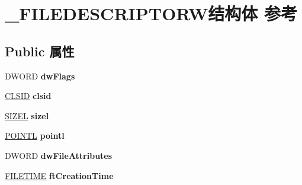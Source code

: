\hypertarget{struct___f_i_l_e_d_e_s_c_r_i_p_t_o_r_w}{}\section{\+\_\+\+F\+I\+L\+E\+D\+E\+S\+C\+R\+I\+P\+T\+O\+R\+W结构体 参考}
\label{struct___f_i_l_e_d_e_s_c_r_i_p_t_o_r_w}
\subsection*{Public 属性}
\begin{DoxyCompactItemize}
\item 
\mbox{\label{struct___f_i_l_e_d_e_s_c_r_i_p_t_o_r_w_a7b1cb805e66caefee9dcec921955cca6}} 
D\+W\+O\+RD {\bfseries dw\+Flags}
\item 
\mbox{\label{struct___f_i_l_e_d_e_s_c_r_i_p_t_o_r_w_acfcd6350deb7e481fba9cfd61d1a7567}} 
\hyperlink{struct___i_i_d}{C\+L\+S\+ID} {\bfseries clsid}
\item 
\mbox{\label{struct___f_i_l_e_d_e_s_c_r_i_p_t_o_r_w_a06ba887bfd47370d9c2eb83898dbda6a}} 
\hyperlink{structtag_s_i_z_e}{S\+I\+Z\+EL} {\bfseries sizel}
\item 
\mbox{\label{struct___f_i_l_e_d_e_s_c_r_i_p_t_o_r_w_ab551ca3e72cfe9618007b1c0dd280571}} 
\hyperlink{struct___p_o_i_n_t_l}{P\+O\+I\+N\+TL} {\bfseries pointl}
\item 
\mbox{\label{struct___f_i_l_e_d_e_s_c_r_i_p_t_o_r_w_a0bfe756ea352f5a6865c71c982f85bf5}} 
D\+W\+O\+RD {\bfseries dw\+File\+Attributes}
\item 
\mbox{\label{struct___f_i_l_e_d_e_s_c_r_i_p_t_o_r_w_a843bbcbe83a37ec6f75b2773e27309fb}} 
\hyperlink{struct___f_i_l_e_t_i_m_e}{F\+I\+L\+E\+T\+I\+ME} {\bfseries ft\+Creation\+Time}
\item 
\mbox{\label{struct___f_i_l_e_d_e_s_c_r_i_p_t_o_r_w_ac0bd41a4ddcf0b0d37db267bb889cccf}} 

\end{DoxyCompactItemize}
